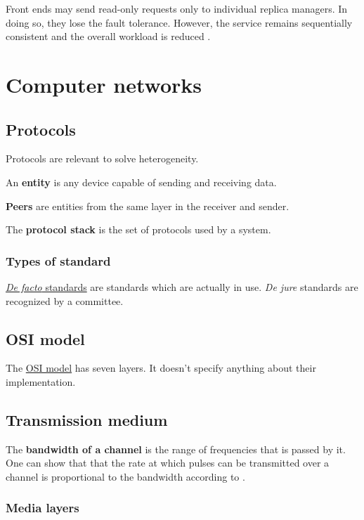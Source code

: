\documentclass[12pt, oneside]{book}
\begin{document}
Front ends may send read-only requests only to individual replica managers.
In doing so, they lose the fault tolerance. However, the service remains sequentially consistent and the overall workload is reduced \cite[p.~782]{distributed-systems-coulouris-2013}.

\chapter{Computer networks}

\section{Protocols}

Protocols are relevant to solve heterogeneity.

An \textbf{entity} is any device capable of sending and receiving data.

\textbf{Peers} are entities from the same layer in the receiver and sender.

The \textbf{protocol stack} is the set of protocols used by a system.

\subsection{Types of standard}

\href{https://en.wikipedia.org/wiki/De_facto_standard}{\emph{De facto}
standards} are standards which are actually in use. \emph{De jure}
standards are recognized by a committee.

\section{OSI model}

The \href{https://en.wikipedia.org/wiki/OSI_model}{OSI model} has seven layers. It doesn't specify anything about their implementation.

\section{Transmission medium}

The \textbf{bandwidth of a channel} is the range of frequencies that is passed by it.
One can show that that the rate at which pulses can be transmitted over a channel is proportional to the bandwidth according to \cite{communication-networks-leon-garcia-2000}.

\subsection{Media layers}
\end{document}
